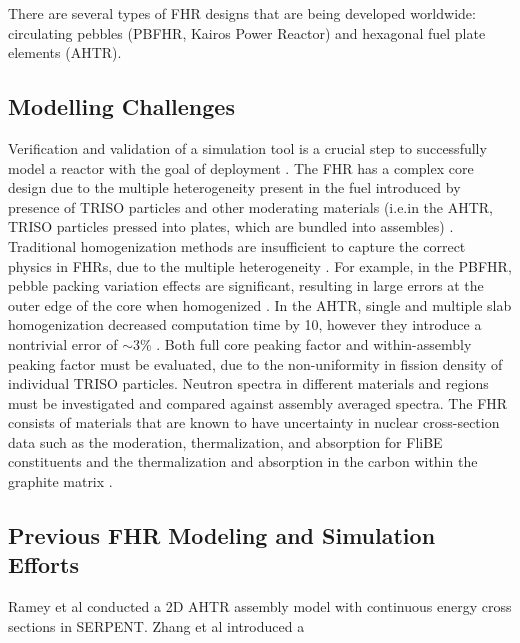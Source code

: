 There are several types of \gls{FHR} designs that are being developed worldwide: 
circulating pebbles (\gls{PBFHR}, Kairos Power Reactor) and hexagonal fuel plate elements (\gls{AHTR}). 


\subsection{Modelling Challenges}
Verification and validation of a simulation tool is a crucial step to successfully 
model a reactor with the goal of deployment \cite{rahnema_phenomena_2019}. 
The \gls{FHR} has a complex core design due to the multiple heterogeneity present 
in the fuel introduced by presence of \gls{TRISO} particles and other moderating 
materials (i.e.in the \gls{AHTR}, \gls{TRISO} particles pressed into plates, which 
are bundled into assembles) \cite{ramey_monte_2018,rahnema_phenomena_2019}.
Traditional homogenization methods are insufficient to capture the correct physics 
in \glspl{FHR}, due to the multiple heterogeneity \cite{ramey_monte_2018}. 
For example, in the \gls{PBFHR}, pebble packing variation effects are significant, 
resulting in large errors at the outer edge of the core when homogenized 
\cite{rahnema_phenomena_2019}. 
In the \gls{AHTR}, single and multiple slab homogenization decreased computation time 
by 10, however they introduce a nontrivial error of $\sim$3\%
\cite{ramey_monte_2018,cisneros_neutronics_2012}.
Both full core peaking factor and within-assembly peaking factor must be evaluated, 
due to the non-uniformity in fission density of individual \gls{TRISO} particles. 
Neutron spectra in different materials and regions must be investigated and compared 
against assembly averaged spectra. 
The \gls{FHR} consists of materials that are known to have uncertainty 
in nuclear cross-section data such as the moderation, thermalization, and absorption 
for FliBE constituents and the thermalization and absorption 
in the carbon within the graphite matrix \cite{rahnema_phenomena_2019}. 
 
\subsection{Previous \gls{FHR} Modeling and Simulation Efforts}
Ramey et al \cite{ramey_monte_2018} conducted a 2D \gls{AHTR} assembly model with 
continuous energy cross sections in SERPENT.
Zhang et al introduced a 

